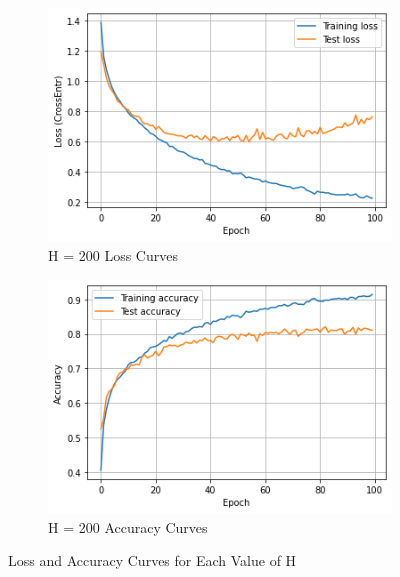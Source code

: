 \documentclass{homework}
\begin{document}
\begin{figure}[H]
\medskip
\begin{subfigure}{0.4\textwidth}
\includegraphics[width=\linewidth]{hw3_h200_loss.png}
\caption{H = 200 Loss Curves} \label{fig:e}
\end{subfigure}\hspace*{\fill}
\begin{subfigure}{0.4\textwidth}
\includegraphics[width=\linewidth]{hw3_h200_acc.png}
\caption{H = 200 Accuracy Curves} \label{fig:f}
\end{subfigure}
\caption{Loss and Accuracy Curves for Each Value of H}
\label{performance}
\end{figure}
\end{document}
